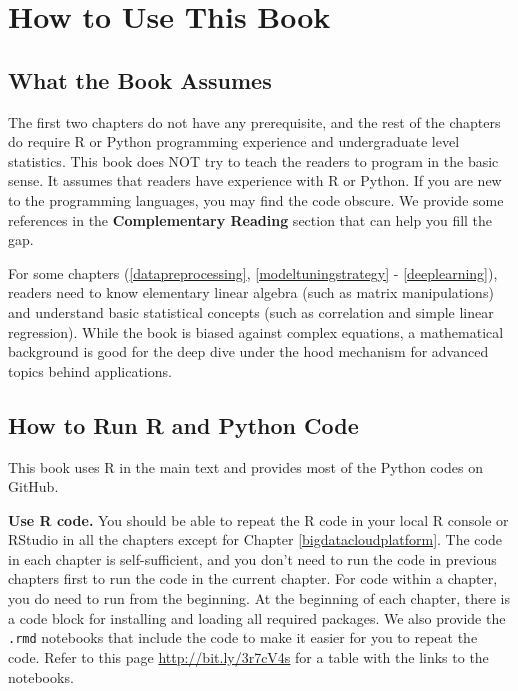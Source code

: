 \documentclass[
  12pt,
]{krantz}
\begin{document}
\hypertarget{how-to-use-this-book}{%
\section*{How to Use This Book}\label{how-to-use-this-book}}


\hypertarget{what-the-book-assumes}{%
\subsection*{What the Book Assumes}\label{what-the-book-assumes}}


The first two chapters do not have any prerequisite, and the rest of the chapters do require R or Python programming experience and undergraduate level statistics. This book does NOT try to teach the readers to program in the basic sense. It assumes that readers have experience with R or Python.
If you are new to the programming languages, you may find the code obscure. We provide some references in the \textbf{Complementary Reading} section that can help you fill the gap.

For some chapters (\ref{datapreprocessing}, \ref{modeltuningstrategy} - \ref{deeplearning}), readers need to know elementary linear algebra (such as matrix manipulations) and understand basic statistical concepts (such as correlation and simple linear regression). While the book is biased against complex equations, a mathematical background is good for the deep dive under the hood mechanism for advanced topics behind applications.

\hypertarget{how-to-run-r-and-python-code}{%
\subsection*{How to Run R and Python Code}\label{how-to-run-r-and-python-code}}


This book uses R in the main text and provides most of the Python codes on GitHub.

\textbf{Use R code.} You should be able to repeat the R code in your local R console or RStudio in all the chapters except for Chapter \ref{bigdatacloudplatform}. The code in each chapter is self-sufficient, and you don't need to run the code in previous chapters first to run the code in the current chapter. For code within a chapter, you do need to run from the beginning. At the beginning of each chapter, there is a code block for installing and loading all required packages. We also provide the \texttt{.rmd} notebooks that include the code to make it easier for you to repeat the code. Refer to this page \url{http://bit.ly/3r7cV4s} for a table with the links to the notebooks.
\end{document}
